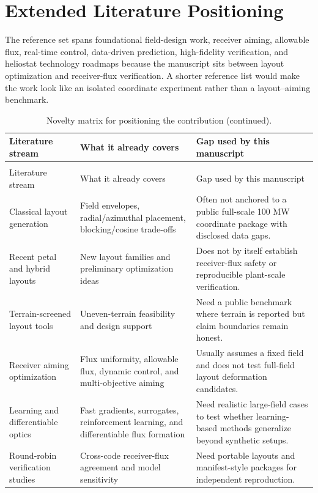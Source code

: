 \documentclass[final,3p,times]{elsarticle}
\begin{document}
\section{Extended Literature Positioning}
The reference set spans foundational field-design work, receiver aiming, allowable flux, real-time control, data-driven prediction, high-fidelity verification, and heliostat technology roadmaps because the manuscript sits between layout optimization and receiver-flux verification. A shorter reference list would make the work look like an isolated coordinate experiment rather than a layout--aiming benchmark.

\begin{longtable}{p{}p{}p{}}
\caption{Novelty matrix for positioning the contribution.} \label{tab:novelty-matrix}\\
\toprule
Literature stream & What it already covers & Gap used by this manuscript \\
\midrule
\endfirsthead
\caption[]{Novelty matrix for positioning the contribution (continued).}\\
\toprule
Literature stream & What it already covers & Gap used by this manuscript \\
\midrule
\endhead
Classical layout generation & Field envelopes, radial/azimuthal placement, blocking/cosine trade-offs & Often not anchored to a public full-scale 100 MW coordinate package with disclosed data gaps. \\
Recent petal and hybrid layouts & New layout families and preliminary optimization ideas & Does not by itself establish receiver-flux safety or reproducible plant-scale verification. \\
Terrain-screened layout tools & Uneven-terrain feasibility and design support & Need a public benchmark where terrain is reported but claim boundaries remain honest. \\
Receiver aiming optimization & Flux uniformity, allowable flux, dynamic control, and multi-objective aiming & Usually assumes a fixed field and does not test full-field layout deformation candidates. \\
Learning and differentiable optics & Fast gradients, surrogates, reinforcement learning, and differentiable flux formation & Need realistic large-field cases to test whether learning-based methods generalize beyond synthetic setups. \\
Round-robin verification studies & Cross-code receiver-flux agreement and model sensitivity & Need portable layouts and manifest-style packages for independent reproduction. \\
\bottomrule
\end{longtable}
\end{document}
